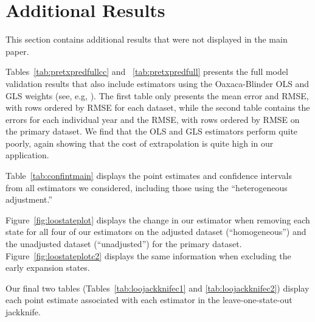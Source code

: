 \section{Additional Results}\label{app:allresults}

This section contains additional results that were not displayed in the main paper.

Tables~\ref{tab:pretxpredfullcc} and ~\ref{tab:pretxpredfull} presents the full model validation results that also include estimators using the Oaxaca-Blinder OLS and GLS weights (see, e.g, \cite{kline2011oaxaca}). The first table only presents the mean error and RMSE, with rows ordered by RMSE for each dataset, while the second table contains the errors for each individual year and the RMSE, with rows ordered by RMSE on the primary dataset. We find that the OLS and GLS estimators perform quite poorly, again showing that the cost of extrapolation is quite high in our application. 

Table~\ref{tab:confintmain} displays the point estimates and confidence intervals from all estimators we considered, including those using the ``heterogeneous adjustment.''

Figure~\ref{fig:loostateplot} displays the change in our estimator when removing each state for all four of our estimators on the adjusted dataset (``homogeneous'') and the unadjusted dataset (``unadjusted'') for the primary dataset. Figure~\ref{fig:loostateplotc2} displays the same information when excluding the early expansion states. 

Our final two tables (Tables~\ref{tab:loojackknifec1} and \ref{tab:loojackknifec2}) display each point estimate associated with each estimator in the leave-one-state-out jackknife.

